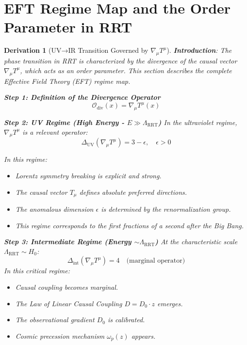 \documentclass[10pt, a4paper]{article}
\newtheorem{derivation}{Derivation}
\begin{document}
\section{EFT Regime Map and the Order Parameter in RRT}

\begin{derivation}[UV→IR Transition Governed by $\nabla_\mu T^\mu$]
\textbf{Introduction}: The phase transition in RRT is characterized by the divergence of the causal vector $\nabla_\mu T^\mu$, which acts as an order parameter. This section describes the complete Effective Field Theory (EFT) regime map.

\textbf{Step 1: Definition of the Divergence Operator}
\begin{equation}
\mathcal{O}_{\text{div}}(x) = \nabla_\mu T^\mu(x)
\tag{1.10}
\end{equation}

\textbf{Step 2: UV Regime (High Energy - $E \gg \Lambda_{\text{RRT}}$)}
In the ultraviolet regime, $\nabla_\mu T^\mu$ is a relevant operator:
\begin{equation}
\Delta_{\text{UV}}(\nabla_\mu T^\mu) = 3 - \epsilon, \quad \epsilon > 0
\tag{1.11}
\end{equation}

In this regime:
\begin{itemize}
\item Lorentz symmetry breaking is explicit and strong.
\item The causal vector $T_\mu$ defines absolute preferred directions.
\item The anomalous dimension $\epsilon$ is determined by the renormalization group.
\item This regime corresponds to the first fractions of a second after the Big Bang.
\end{itemize}

\textbf{Step 3: Intermediate Regime (Energy $\sim \Lambda_{\text{RRT}}$)}
At the characteristic scale $\Lambda_{\text{RRT}} \sim H_0$:
\begin{equation}
\Delta_{\text{int}}(\nabla_\mu T^\mu) = 4 \quad \text{(marginal operator)}
\tag{1.12}
\end{equation}
In this critical regime:
\begin{itemize}
\item Causal coupling becomes marginal.
\item The Law of Linear Causal Coupling $D = D_0 \cdot z$ emerges.
\item The observational gradient $D_0$ is calibrated.
\item Cosmic precession mechanism $\omega_p(z)$ appears.
\end{itemize}


\end{derivation}
\end{document}
